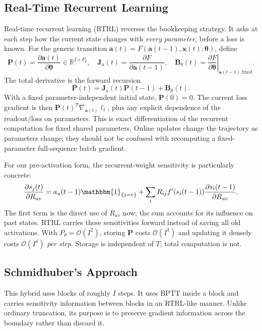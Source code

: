 \documentclass[11pt, oneside]{book}
\newcommand{\R}{\mathbb{R}}
\newcommand{\ind}{\mathbbm{1}}
\newcommand{\T}{^{\mathsf{T}}}           %
\newcommand{\params}{\boldsymbol{\theta}}   %
\newcommand{\bigO}[1]{\mathcal{O}\!\left(#1\right)}
\let\originalsubsection\subsection
\renewcommand{\subsection}{\Needspace{6\baselineskip}\originalsubsection}
\begin{document}
\subsection{Real-Time Recurrent Learning}\label{sec:source-2-4-2}
Real-time recurrent learning (RTRL) reverses the bookkeeping strategy. It asks at each step how the current state changes with \emph{every parameter}, before a loss is known. For the generic transition $\mathbf{a}(t)=F(\mathbf{a}(t-1),\mathbf{x}(t);\params)$, define
\[
 \mathbf{P}(t)=\frac{\partial\mathbf{a}(t)}{\partial\params}\in\R^{I\times P_\theta},
 \quad \mathbf{J}_a(t)=\frac{\partial F}{\partial\mathbf{a}(t-1)},
 \quad \mathbf{B}_\theta(t)=\left.\frac{\partial F}{\partial\params}\right|_{\mathbf{a}(t-1)\ \mathrm{fixed}}.
\]
The total derivative is the forward recursion
\begin{equation}
 \mathbf{P}(t)=\mathbf{J}_a(t)\mathbf{P}(t-1)+\mathbf{B}_\theta(t).
 \label{eq:rtrl}
\end{equation}
With a fixed parameter-independent initial state, $\mathbf{P}(0)=0$. The current loss gradient is then $\mathbf{P}(t)\T\nabla_{\mathbf{a}(t)}\ell_t$, plus any explicit dependence of the readout/loss on parameters. This is exact differentiation of the recurrent computation for fixed shared parameters. Online updates change the trajectory as parameters change; they should not be confused with recomputing a fixed-parameter full-sequence batch gradient.

For our pre-activation form, the recurrent-weight sensitivity is particularly concrete:
\[
 \frac{\partial s_j(t)}{\partial R_{uv}}
 =a_u(t-1)\ind_{\{j=v\}}+
 \sum_i R_{ij}f'(s_i(t-1))\frac{\partial s_i(t-1)}{\partial R_{uv}}.
\]
The first term is the direct use of $R_{uv}$ now; the sum accounts for its influence on past states. RTRL carries these sensitivities forward instead of saving all old activations. With $P_\theta=\bigO{I^2}$, storing $\mathbf{P}$ costs $\bigO{I^3}$ and updating it densely costs $\bigO{I^4}$ \emph{per step}. Storage is independent of $T$; total computation is not.

\subsection{Schmidhuber's Approach}\label{sec:source-2-4-3}
This hybrid uses blocks of roughly $I$ steps. It uses BPTT inside a block and carries sensitivity information between blocks in an RTRL-like manner. Unlike ordinary truncation, its purpose is to preserve gradient information across the boundary rather than discard it.
\end{document}
